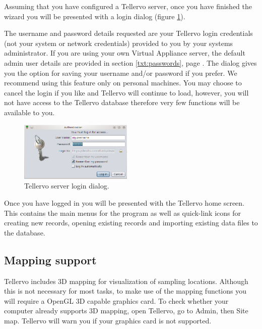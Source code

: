 Assuming that you have configured a Tellervo server, once you have finished the wizard you will be presented with a login dialog (figure \ref{fig:login}).

The username and password details requested are your Tellervo login credentials (not your system or network credentials) provided to you by your systems administrator.  If you are using your own Virtual Appliance server, the default admin user details are provided in section \ref{txt:passwords}, page \pageref{txt:passwords}.  The dialog gives you the option for saving your username and/or password if you prefer.  We recommend using this feature only on personal machines.  You may choose to cancel the login if you like and Tellervo will continue to load, however, you will not have access to the Tellervo database therefore very few functions will be available to you.

\begin{figure}
  \begin{center}
    \includegraphics[width=0.48\textwidth]{Images/login.png}
  \end{center}
  \caption{Tellervo server login dialog.}
  \label{fig:login}
\end{figure}

Once you have logged in you will be presented with the Tellervo home screen.  This contains the main menus for the program as well as quick-link icons for creating new records, opening existing records and importing existing data files to the database.


\subsection{Mapping support}
Tellervo includes 3D mapping for visualization of sampling locations. Although this is not necessary for most tasks, to make use of the mapping functions you will require a OpenGL 3D capable graphics card. To check whether your computer already supports 3D mapping, open Tellervo, go to Admin, then Site map.  Tellervo will warn you if your graphics card is not supported.

